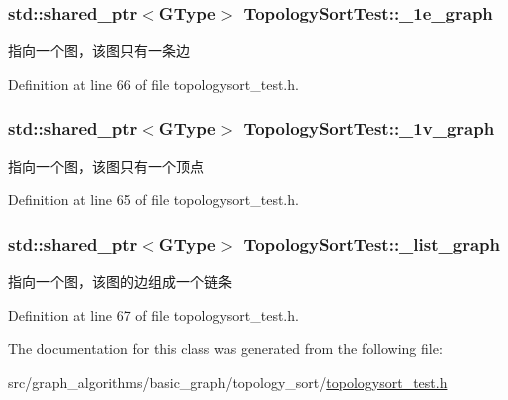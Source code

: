 \subsubsection[{\+\_\+1e\+\_\+graph}]{\setlength{\rightskip}{0pt plus 5cm}std\+::shared\+\_\+ptr$<${\bf G\+Type}$>$ Topology\+Sort\+Test\+::\+\_\+1e\+\_\+graph\hspace{0.3cm}{\ttfamily [protected]}}\label{class_topology_sort_test_af1fe553500cfb175b236a0302d9044af}
指向一个图，该图只有一条边 

Definition at line 66 of file topologysort\+\_\+test.\+h.

\hypertarget{class_topology_sort_test_a087401853f564307534465e2ac59c0ef}{}
\subsubsection[{\+\_\+1v\+\_\+graph}]{\setlength{\rightskip}{0pt plus 5cm}std\+::shared\+\_\+ptr$<${\bf G\+Type}$>$ Topology\+Sort\+Test\+::\+\_\+1v\+\_\+graph\hspace{0.3cm}{\ttfamily [protected]}}\label{class_topology_sort_test_a087401853f564307534465e2ac59c0ef}
指向一个图，该图只有一个顶点 

Definition at line 65 of file topologysort\+\_\+test.\+h.

\hypertarget{class_topology_sort_test_ac664dd33d2aa257a993c1835caa0d5ad}{}
\subsubsection[{\+\_\+list\+\_\+graph}]{\setlength{\rightskip}{0pt plus 5cm}std\+::shared\+\_\+ptr$<${\bf G\+Type}$>$ Topology\+Sort\+Test\+::\+\_\+list\+\_\+graph\hspace{0.3cm}{\ttfamily [protected]}}\label{class_topology_sort_test_ac664dd33d2aa257a993c1835caa0d5ad}
指向一个图，该图的边组成一个链条 

Definition at line 67 of file topologysort\+\_\+test.\+h.



The documentation for this class was generated from the following file\+:\begin{DoxyCompactItemize}
\item 
src/graph\+\_\+algorithms/basic\+\_\+graph/topology\+\_\+sort/\hyperlink{topologysort__test_8h}{topologysort\+\_\+test.\+h}\end{DoxyCompactItemize}
